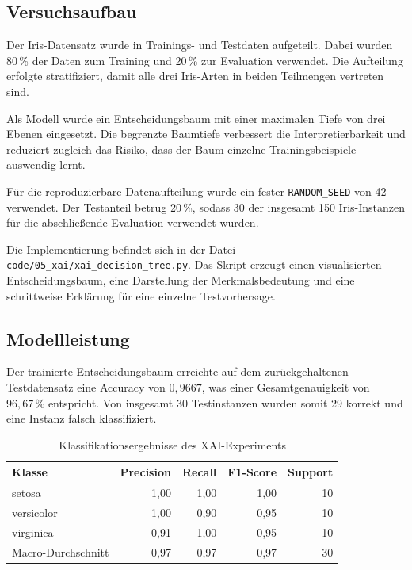 \documentclass[12pt,a4paper]{article}
\begin{document}
\subsection{Versuchsaufbau}

Der Iris-Datensatz wurde in Trainings- und Testdaten aufgeteilt.
Dabei wurden 80\,\% der Daten zum Training und 20\,\% zur Evaluation
verwendet. Die Aufteilung erfolgte stratifiziert, damit alle drei
Iris-Arten in beiden Teilmengen vertreten sind.

Als Modell wurde ein Entscheidungsbaum mit einer maximalen Tiefe von
drei Ebenen eingesetzt. Die begrenzte Baumtiefe verbessert die
Interpretierbarkeit und reduziert zugleich das Risiko, dass der Baum
einzelne Trainingsbeispiele auswendig lernt.

Für die reproduzierbare Datenaufteilung wurde ein fester
\texttt{RANDOM\_SEED} von 42 verwendet. Der Testanteil betrug
20\,\%, sodass 30 der insgesamt 150 Iris-Instanzen für die
abschließende Evaluation verwendet wurden.

Die Implementierung befindet sich in der Datei
\texttt{code/05\_xai/xai\_decision\_tree.py}. Das Skript erzeugt
einen visualisierten Entscheidungsbaum, eine Darstellung der
Merkmalsbedeutung und eine schrittweise Erklärung für eine einzelne
Testvorhersage.

\subsection{Modellleistung}

Der trainierte Entscheidungsbaum erreichte auf dem zurückgehaltenen
Testdatensatz eine Accuracy von \(0{,}9667\), was einer
Gesamtgenauigkeit von \(96{,}67\,\%\) entspricht. Von insgesamt
30 Testinstanzen wurden somit 29 korrekt und eine Instanz falsch
klassifiziert.

\begin{table}[H]
\centering
\caption{Klassifikationsergebnisse des XAI-Experiments}
\label{tab:xai-classification-results}
\begin{tabular}{lrrrr}
\toprule
\textbf{Klasse} &
\textbf{Precision} &
\textbf{Recall} &
\textbf{F1-Score} &
\textbf{Support} \\
\midrule
setosa     & 1{,}00 & 1{,}00 & 1{,}00 & 10 \\
versicolor & 1{,}00 & 0{,}90 & 0{,}95 & 10 \\
virginica  & 0{,}91 & 1{,}00 & 0{,}95 & 10 \\
\midrule
Macro-Durchschnitt & 0{,}97 & 0{,}97 & 0{,}97 & 30 \\
\bottomrule
\end{tabular}
\end{table}
\end{document}
